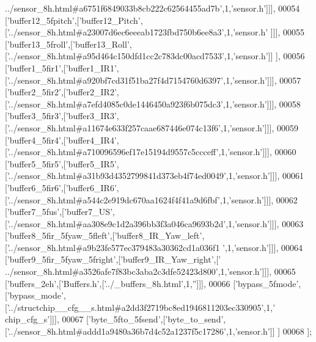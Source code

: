 \begin{DoxyCode}
{      ../sensor\_8h.html#a6751f6849033b8cb222c62564455ad7b'},1,\textcolor{stringliteral}{'sensor.h'}]]],
00054   [\textcolor{stringliteral}{'buffer12\_5fpitch'},[\textcolor{stringliteral}{'buffer12\_Pitch'},[\textcolor{stringliteral}{'../sensor\_8h.html#a23007d6ec6eeeab1723fbd750b6ee8a3'},1,\textcolor{stringliteral}{'sensor.h'}
      ]]],
00055   [\textcolor{stringliteral}{'buffer13\_5froll'},[\textcolor{stringliteral}{'buffer13\_Roll'},[\textcolor{stringliteral}{'../sensor\_8h.html#a95d464c150dfd1cc2c783dc00acd7533'},1,\textcolor{stringliteral}{'sensor.h'}]]
      ],
00056   [\textcolor{stringliteral}{'buffer1\_5fir1'},[\textcolor{stringliteral}{'buffer1\_IR1'},[\textcolor{stringliteral}{'../sensor\_8h.html#a920bf7cd31f51ba27f4d7154760d6397'},1,\textcolor{stringliteral}{'sensor.h'}]]],
00057   [\textcolor{stringliteral}{'buffer2\_5fir2'},[\textcolor{stringliteral}{'buffer2\_IR2'},[\textcolor{stringliteral}{'../sensor\_8h.html#a7efd4085c0de1446450a923f6b075dc3'},1,\textcolor{stringliteral}{'sensor.h'}]]],
00058   [\textcolor{stringliteral}{'buffer3\_5fir3'},[\textcolor{stringliteral}{'buffer3\_IR3'},[\textcolor{stringliteral}{'../sensor\_8h.html#a11674e633f257caae687446e074c13f6'},1,\textcolor{stringliteral}{'sensor.h'}]]],
00059   [\textcolor{stringliteral}{'buffer4\_5fir4'},[\textcolor{stringliteral}{'buffer4\_IR4'},[\textcolor{stringliteral}{'../sensor\_8h.html#a710096596ef17e15194d9557c5ccceff'},1,\textcolor{stringliteral}{'sensor.h'}]]],
00060   [\textcolor{stringliteral}{'buffer5\_5fir5'},[\textcolor{stringliteral}{'buffer5\_IR5'},[\textcolor{stringliteral}{'../sensor\_8h.html#a31b93d4352799841d373eb4f74ed0049'},1,\textcolor{stringliteral}{'sensor.h'}]]],
00061   [\textcolor{stringliteral}{'buffer6\_5fir6'},[\textcolor{stringliteral}{'buffer6\_IR6'},[\textcolor{stringliteral}{'../sensor\_8h.html#a544c2e919dc670aa1624f4f41a9d6fbf'},1,\textcolor{stringliteral}{'sensor.h'}]]],
00062   [\textcolor{stringliteral}{'buffer7\_5fus'},[\textcolor{stringliteral}{'buffer7\_US'},[\textcolor{stringliteral}{'../sensor\_8h.html#aa308e9c1d2a396bb3f3a046ca9693b2d'},1,\textcolor{stringliteral}{'sensor.h'}]]],
00063   [\textcolor{stringliteral}{'buffer8\_5fir\_5fyaw\_5fleft'},[\textcolor{stringliteral}{'buffer8\_IR\_Yaw\_left'},[\textcolor{stringliteral}{'../sensor\_8h.html#a9b23fe577ec379483a30362cd1a036f1
      '},1,\textcolor{stringliteral}{'sensor.h'}]]],
00064   [\textcolor{stringliteral}{'buffer9\_5fir\_5fyaw\_5fright'},[\textcolor{stringliteral}{'buffer9\_IR\_Yaw\_right'},[\textcolor{stringliteral}{'
      ../sensor\_8h.html#a3526afe7f83bc3aba2c3dfe52423d800'},1,\textcolor{stringliteral}{'sensor.h'}]]],
00065   [\textcolor{stringliteral}{'buffers\_2eh'},[\textcolor{stringliteral}{'Buffers.h'},[\textcolor{stringliteral}{'../\_buffers\_8h.html'},1,\textcolor{stringliteral}{''}]]],
00066   [\textcolor{stringliteral}{'bypass\_5fmode'},[\textcolor{stringliteral}{'bypass\_mode'},[\textcolor{stringliteral}{'../structchip\_\_cfg\_\_s.html#a2dd3f2719bc8ed1946811203ec330905'},1,\textcolor{stringliteral}{'
      chip\_cfg\_s'}]]],
00067   [\textcolor{stringliteral}{'byte\_5fto\_5fsend'},[\textcolor{stringliteral}{'byte\_to\_send'},[\textcolor{stringliteral}{'../sensor\_8h.html#addd1a9480a36b7d4c52a1237f5c17286'},1,\textcolor{stringliteral}{'sensor.h'}]]
      ]
00068 ];
\end{DoxyCode}
